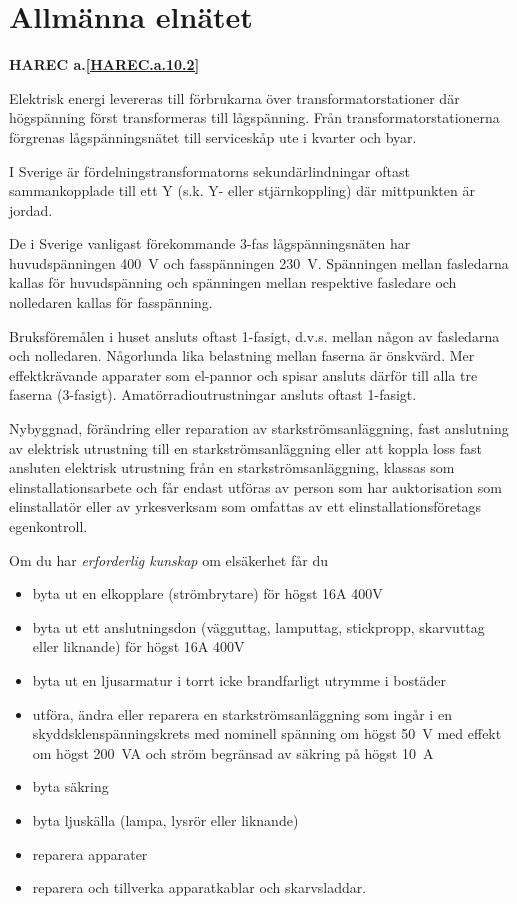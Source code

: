 \section{Allmänna elnätet}
\textbf{
HAREC a.\ref{HAREC.a.10.2}\label{myHAREC.a.10.2}
}
\label{jordning}

Elektrisk energi levereras till förbrukarna över
transformatorstationer där högspänning först transformeras till
lågspänning. Från transformatorstationerna förgrenas lågspänningsnätet
till serviceskåp ute i kvarter och byar.

I Sverige är fördelningstransformatorns sekundärlindningar oftast
sammankopplade till ett Y (s.k. Y- eller stjärnkoppling) där
mittpunkten är jordad.

De i Sverige vanligast förekommande 3-fas lågspänningsnäten har
huvudspänningen 400~V och fasspänningen 230~V. Spänningen mellan fasledarna
kallas för huvudspänning och spänningen mellan respektive fasledare och
nolledaren kallas för fasspänning.

Bruksföremålen i huset ansluts oftast 1-fasigt, d.v.s. mellan någon av
fasledarna och nolledaren.
Någorlunda lika belastning mellan faserna är önskvärd.
Mer effektkrävande apparater som el-pannor och spisar ansluts därför till alla
tre faserna (3-fasigt).
Amatörradioutrustningar ansluts oftast 1-fasigt.

Nybyggnad, förändring eller reparation av starkströmsanläggning,
fast anslutning av elektrisk utrustning till en starkströmsanläggning
eller att koppla loss fast ansluten elektrisk utrustning från en
starkströmsanläggning, klassas som elinstallationsarbete och får endast
utföras av person som har auktorisation som elinstallatör eller av
yrkesverksam som omfattas av ett elinstallationsföretags egenkontroll.

Om du har \emph{erforderlig kunskap} om elsäkerhet får du
\begin{itemize}
\item byta ut en elkopplare (strömbrytare) för högst 16A 400V
\item byta ut ett anslutningsdon (vägguttag, lamputtag, stickpropp,
skarvuttag eller liknande) för högst 16A 400V
\item byta ut en ljusarmatur i torrt icke brandfarligt utrymme i bostäder
\item utföra, ändra eller reparera en starkströmsanläggning som ingår i en
skyddsklenspänningskrets med nominell spänning om högst 50~V med effekt om
högst 200~VA och ström begränsad av säkring på högst 10~A
\item byta säkring
\item byta ljuskälla (lampa, lysrör eller liknande)
\item reparera apparater
\item reparera och tillverka apparatkablar och skarvsladdar.
\end{itemize}

